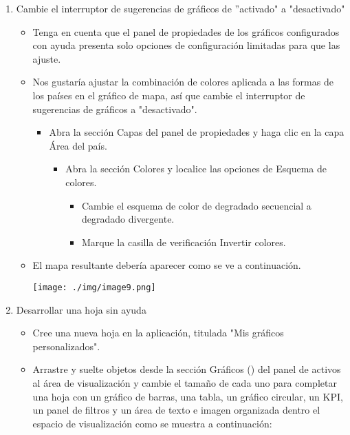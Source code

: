 \documentclass[12pt,letterpaper]{article}
\begin{document}
\begin{enumerate}
\begin{itemize}
\begin{itemize}
\begin{center}
            \end{center}
        \end{itemize}
    \end{itemize}
    \item Cambie el interruptor de sugerencias de gráficos de ''activado" a "desactivado"
    \begin{itemize}
        \item Tenga en cuenta que el panel de propiedades de los gráficos configurados con ayuda presenta solo opciones de configuración limitadas para que las ajuste.
        \item Nos gustaría ajustar la combinación de colores aplicada a las formas de los países en el gráfico de mapa, así que cambie el interruptor de sugerencias de gráficos a "desactivado".
        \begin{itemize}
            \item Abra la sección Capas del panel de propiedades y haga clic en la capa Área del país.
            \begin{itemize}
                \item Abra la sección Colores y localice las opciones de Esquema de colores.
                \begin{itemize}
                    \item Cambie el esquema de color de degradado secuencial a degradado divergente.
                    \item Marque la casilla de verificación Invertir colores.
                \end{itemize}
            \end{itemize}
        \end{itemize}
        \item El mapa resultante debería aparecer como se ve a continuación.
        \begin{center}
            \texttt{[image: ./img/image9.png]} 
        \end{center}
    \end{itemize}
    \item Desarrollar una hoja sin ayuda
    \begin{itemize}
        \item Cree una nueva hoja en la aplicación, titulada "Mis gráficos personalizados".
        \item Arrastre y suelte objetos desde la sección Gráficos () del panel de activos al área de visualización y cambie el tamaño de cada uno para completar una hoja con un gráfico de barras, una tabla, un gráfico circular, un KPI, un panel de filtros y un área de texto e imagen organizada dentro el espacio de visualización como se muestra a continuación:

\end{itemize}
\end{enumerate}
\end{document}
